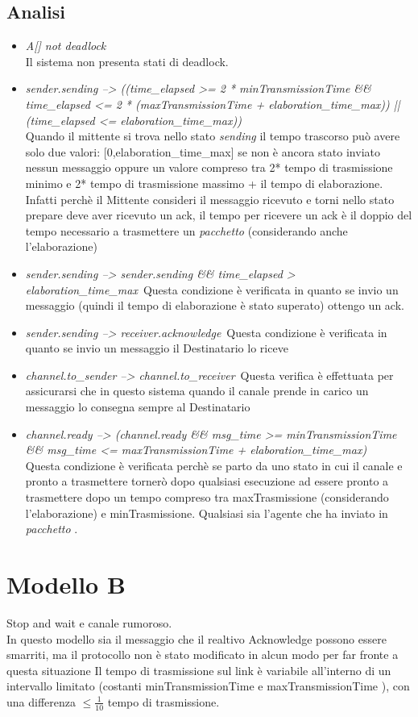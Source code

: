 \documentclass[a4paper]{article}
\newcommand{\pacchetto}{\textit{pacchetto }}
\begin{document}
\subsection{Analisi}
\begin{itemize}
	\item \textit{A[] not deadlock}\\
		Il sistema non presenta stati di deadlock.
	\item \textit{sender.sending --> ((time\_elapsed >= 2 * minTransmissionTime \&\& time\_elapsed <= 2 * (maxTransmissionTime + elaboration\_time\_max)) ||(time\_elapsed <= elaboration\_time\_max))}\\
		Quando il mittente si trova nello stato \textit{sending} il tempo trascorso può avere solo due valori: [0,elaboration\_time\_max] se non è ancora stato inviato nessun messaggio oppure un valore compreso tra 2* tempo di trasmissione minimo e 2* tempo di trasmissione massimo + il tempo di elaborazione. Infatti perchè il Mittente consideri il messaggio ricevuto e torni nello stato prepare deve aver ricevuto un ack, il tempo per ricevere un ack è il doppio del tempo necessario a trasmettere un \pacchetto (considerando anche l'elaborazione)
	\item \textit{sender.sending --> sender.sending \&\& time\_elapsed > elaboration\_time\_max}\
		Questa condizione è verificata in quanto se invio un messaggio (quindi il tempo di elaborazione è stato superato) ottengo un ack. 
	\item \textit{sender.sending --> receiver.acknowledge}\
		Questa condizione è verificata in quanto se invio un messaggio il Destinatario lo riceve
	\item \textit{channel.to\_sender --> channel.to\_receiver}\
		Questa verifica è effettuata per assicurarsi che in questo sistema quando il canale prende in carico un messaggio lo consegna sempre al Destinatario
	\item \textit{channel.ready --> (channel.ready \&\& msg\_time >= minTransmissionTime \&\& msg\_time <= maxTransmissionTime + elaboration\_time\_max)}\\
		Questa condizione è verificata perchè se parto da uno stato in cui il canale e pronto a trasmettere tornerò dopo qualsiasi esecuzione ad essere pronto a trasmettere dopo un tempo compreso tra maxTrasmissione (considerando l'elaborazione) e minTrasmissione.
		Qualsiasi sia l'agente che ha inviato in \pacchetto.
\end{itemize}

\section{Modello B}
Stop and wait e canale rumoroso.\\ 
In questo modello sia il messaggio che il realtivo Acknowledge possono essere smarriti, ma il protocollo non è stato modificato in alcun modo per far fronte a questa situazione
Il tempo di trasmissione sul link è variabile all’interno di un intervallo limitato (costanti minTransmissionTime e maxTransmissionTime ), con una differenza $\leq \frac{1}{10}$ tempo di trasmissione. 
\end{document}
